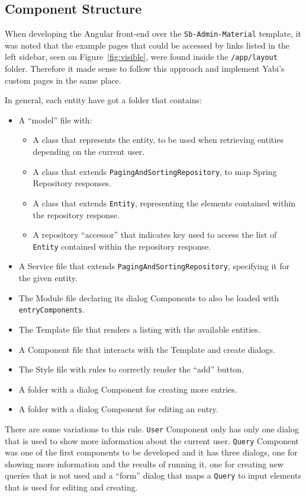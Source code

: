\subsection{Component Structure}
When developing the Angular front-end over the \texttt{Sb-Admin-Material} template, it was noted that the example pages that could be accessed by links listed in the left sidebar, seen on Figure~\ref{fig:visible}, were found inside the \texttt{/app/layout} folder. Therefore it made sense to follow this approach and implement \gls{Yabi}'s custom pages in the same place.

In general, each entity have got a folder that contains:
\begin{itemize}
\item A ``model'' file with:
  \begin{itemize}
  \item A class that represents the entity, to be used when retrieving entities depending on the current user.
  \item A class that extends \texttt{PagingAndSortingRepository}, to map Spring Repository responses.
  \item A class that extends \texttt{Entity}, representing the elements contained within the repository response.
  \item A repository ``accessor'' that indicates key used to access the list of \texttt{Entity} contained within the repository response.
  \end{itemize}
\item A Service file that extends \texttt{PagingAndSortingRepository}, specifying it for the given entity.
\item The Module file declaring its dialog Components to also be loaded with \texttt{entryComponents}.
\item The Template file that renders a listing with the available entities.
\item A Component file that interacts with the Template and create dialogs.
\item The Style file with rules to correctly render the ``add'' button.
\item A folder with a dialog Component for creating more entries.
\item A folder with a dialog Component for editing an entry.
\end{itemize}

There are some variations to this rule. \texttt{User} Component only has only one dialog that is used to show more information about the current user. \texttt{Query} Component was one of the first components to be developed and it has three dialogs, one for showing more information and the results of running it, one for creating new queries that is not used and a ``form'' dialog that maps a \texttt{Query} to input elements that is used for editing and creating.

